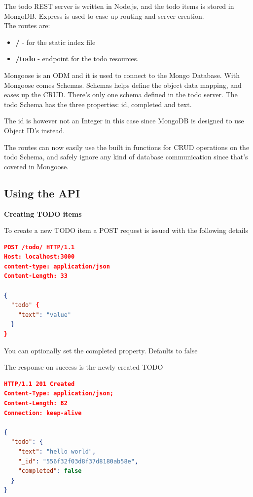 \documentclass[a4paper,danish]{dnacm} %
\begin{document}
The todo REST server is written in Node.js, and the todo items is stored in MongoDB.
Express is used to ease up routing and server creation. \\

The routes are:

\begin{itemize} 
\item{ \textbf{/} - for the static index file}
\item{ \textbf{/todo} - endpoint for the todo resources.}
\end{itemize} 

Mongoose is an ODM and it is used to connect to the Mongo Database. With Mongoose comes Schemas. Schemas helps define the object data mapping, and eases up the CRUD. There's only one schema defined in the todo server. The todo Schema has the three properties: id, completed and text.

The id is however not an Integer in this case since MongoDB is designed to use Object ID's instead.

The routes can now easily use the built in functions for CRUD operations on the todo Schema, and safely ignore any kind of database communication since that's covered in Mongoose.

\subsection{Using the API}

\textbf{Creating TODO items}

To create a new TODO item a POST request is issued with the following details\\

\begin{lstlisting}[language=json,firstnumber=1]
POST /todo/ HTTP/1.1
Host: localhost:3000
content-type: application/json
Content-Length: 33

{
  "todo" {
    "text": "value"
  }
}
\end{lstlisting}


You can optionally set the completed property. Defaults to false

The response on success is the newly created TODO

\begin{lstlisting}[language=json,firstnumber=1]
HTTP/1.1 201 Created
Content-Type: application/json;
Content-Length: 82
Connection: keep-alive

{
  "todo": {
    "text": "hello world",
    "_id": "556f32f03d8f37d8180ab58e", 
    "completed": false
  }
}

\end{lstlisting}
\end{document}
